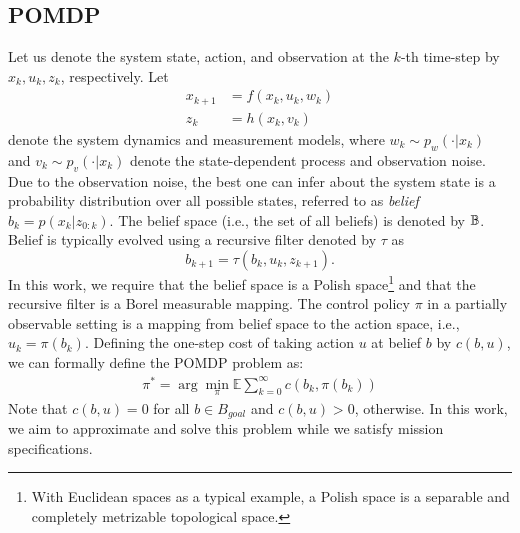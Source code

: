 \documentclass[conference]{IEEEtran}
\begin{document}
	\subsection{POMDP}
	Let us denote the system state, action, and observation at the $k$-th time-step by $x_k, u_k, z_k$, respectively. Let
	\begin{align}
	x_{k+1} &= f(x_k,u_k,w_k) \label{eq:dynamics} \\
	z_k &= h(x_k,v_k) \label{eq:observations}
	\end{align}
	denote the system dynamics and measurement models, where $w_k\sim p_w(\cdot|x_k)$ and $v_k\sim p_v(\cdot|x_k)$ denote the state-dependent process and observation noise. Due to the observation noise, the best one can infer about the system state is a probability distribution over all possible states, referred to as \emph{belief} $b_k=p(x_k|z_{0:k})$. The belief space (i.e., the set of all beliefs) is denoted by $\mathbb{B}$. Belief is typically evolved using a recursive filter denoted by $\tau$ as
	\begin{equation}
	\label{eq:filter}
	b_{k+1}=\tau(b_k,u_k,z_{k+1}).
	\end{equation}
    In this work, we require that the belief space is a Polish space\footnote{With Euclidean spaces as a typical example, a Polish space is a separable and completely metrizable topological space.} and that the recursive filter is a Borel measurable mapping.
%
%
    The control policy $\pi$ in a partially observable setting is a mapping from belief space to the action space, i.e., $u_k=\pi(b_k)$. Defining the one-step cost of taking action $u$ at belief $b$ by $c(b,u)$, we can formally define the POMDP problem as: 
    \begin{align}
    \pi^*=\arg\min_\pi\mathbb{E}\sum_{k=0}^{\infty}c(b_k,\pi(b_k))
    \end{align}
    Note that $c(b,u)=0$ for all $b\in B_{goal}$ and $c(b,u)>0$, otherwise. In this work, we aim to approximate and solve this problem while we satisfy mission specifications.
    
\end{document}
